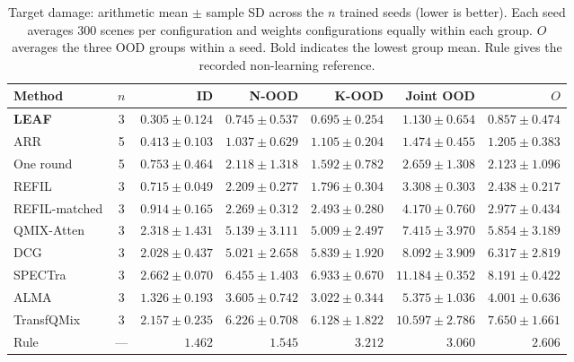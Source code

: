 \begin{table}[t]
\centering\footnotesize
\setlength{\tabcolsep}{3.2pt}
\caption{Target damage: arithmetic mean $\pm$ sample SD across the $n$ trained seeds (lower is better). Each seed averages 300 scenes per configuration and weights configurations equally within each group. $O$ averages the three OOD groups within a seed. Bold indicates the lowest group mean. Rule gives the recorded non-learning reference.}
\label{tab:had-main}
\begin{tabular*}{\textwidth}{@{\extracolsep{\fill}}lcrrrrr}
\toprule
Method & $n$ & ID & N-OOD & K-OOD & Joint OOD & $O$ \\
\midrule
\textbf{LEAF} & 3 & $\mathbf{0.305\pm0.124}$ & $\mathbf{0.745\pm0.537}$ & $\mathbf{0.695\pm0.254}$ & $\mathbf{1.130\pm0.654}$ & $\mathbf{0.857\pm0.474}$ \\
ARR & 5 & $0.413\pm0.103$ & $1.037\pm0.629$ & $1.105\pm0.204$ & $1.474\pm0.455$ & $1.205\pm0.383$ \\
One round & 5 & $0.753\pm0.464$ & $2.118\pm1.318$ & $1.592\pm0.782$ & $2.659\pm1.308$ & $2.123\pm1.096$ \\
REFIL & 3 & $0.715\pm0.049$ & $2.209\pm0.277$ & $1.796\pm0.304$ & $3.308\pm0.303$ & $2.438\pm0.217$ \\
REFIL-matched & 3 & $0.914\pm0.165$ & $2.269\pm0.312$ & $2.493\pm0.280$ & $4.170\pm0.760$ & $2.977\pm0.434$ \\
QMIX-Atten & 3 & $2.318\pm1.431$ & $5.139\pm3.111$ & $5.009\pm2.497$ & $7.415\pm3.970$ & $5.854\pm3.189$ \\
DCG & 3 & $2.028\pm0.437$ & $5.021\pm2.658$ & $5.839\pm1.920$ & $8.092\pm3.909$ & $6.317\pm2.819$ \\
SPECTra & 3 & $2.662\pm0.070$ & $6.455\pm1.403$ & $6.933\pm0.670$ & $11.184\pm0.352$ & $8.191\pm0.422$ \\
ALMA & 3 & $1.326\pm0.193$ & $3.605\pm0.742$ & $3.022\pm0.344$ & $5.375\pm1.036$ & $4.001\pm0.636$ \\
TransfQMix & 3 & $2.157\pm0.235$ & $6.226\pm0.708$ & $6.128\pm1.822$ & $10.597\pm2.786$ & $7.650\pm1.661$ \\
\midrule
Rule & --- & $1.462$ & $1.545$ & $3.212$ & $3.060$ & $2.606$ \\
\bottomrule
\end{tabular*}
\end{table}

